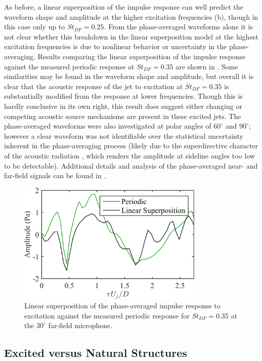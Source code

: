 As before, a linear superposition of the impulse response can well predict the waveform shape and amplitude at the higher excitation frequencies (b), though in this case only up to $St_{DF}  = 0.25$. 
From the phase-averaged waveforms alone it is not clear whether this breakdown in the linear superposition model at the highest excitation frequencies is due to nonlinear behavior or uncertainty in the phase-averaging. 
Results comparing the linear superposition of the impulse response against the measured periodic response at $St_{DF}  = 0.35$ are shown in .
Some similarities may be found in the waveform shape and amplitude, but overall it is clear that the acoustic response of the jet to excitation at $St_{DF}  = 0.35$ is substantially modified from the response at lower frequencies.
Though this is hardly conclusive in its own right, this result does suggest either changing or competing acoustic source mechanisms are present in these excited jets.
The phase-averaged waveforms were also investigated at polar angles of $60^\circ$ and $90^\circ$; however a clear waveform was not identifiable over the statistical uncertainty inherent in the phase-averaging process (likely due to the superdirective character of the acoustic radiation \citep{Crighton1990}, which renders the amplitude at sideline angles too low to be detectable).
Additional details and analysis of the phase-averaged near- and far-field signals can be found in \citet{Crawley2015}.
\begin{figure}
	\centering
	\includegraphics[width=3.5in]{Figures/ch3_farfield_linearsuperposition_st035_v2.png}
	\caption{Linear superposition of the phase-averaged impulse response to excitation against the measured periodic response for $St_{DF} = 0.35$ at the  $30^\circ$ far-field microphone.}
	\label{fig:ch3_farfield_nonlinear}
\end{figure}

\subsection{Excited versus Natural Structures}



